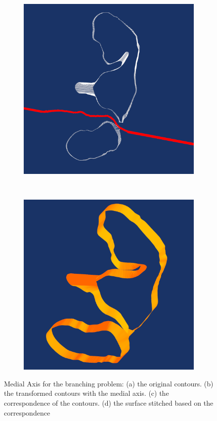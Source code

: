 \documentclass[3p,times]{elsarticle}
\begin{document}
\begin{figure}[ht]
\begin{subfigure}[b]{0.25\textwidth}
\includegraphics[width=\textwidth]{../picture/Medial_correspond_20_21.png}
\caption{}
\label{fig:Medial_correspond_20_21}
\end{subfigure}
~~~~~~~~~~~~~~~~~~~~~~~~~~~~~~~~~~~~
\begin{subfigure}[b]{0.25\textwidth}
\includegraphics[width=\textwidth]{../picture/Medial_surface_20_21.png}
\caption{}
\label{fig:Medial_surface_20_21}
\end{subfigure}
\caption{Medial Axis for the branching problem: (a) the original
  contours. (b) the transformed contours with the medial axis. (c) the
correspondence of the contours. (d) the surface stitched based on the correspondence}
\end{figure}
\end{document}
